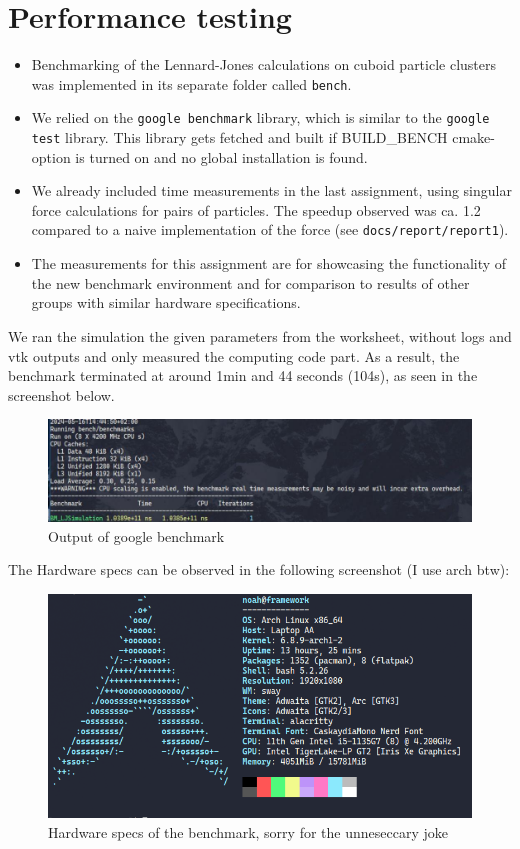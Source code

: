 \documentclass{article}
\begin{document}
\section{Performance testing}
\label{sec:perf}
\begin{itemize}
    \item Benchmarking of the Lennard-Jones calculations on cuboid particle clusters was implemented in its separate folder called \texttt{bench}.
    \item We relied on the \verb|google benchmark| library, which is similar to the \verb|google test| library. This library gets fetched and built if BUILD\_BENCH cmake-option is turned on and no global installation is found.
    \item We already included time measurements in the last assignment, using singular force calculations for pairs of particles. The speedup observed was ca. 1.2 compared to a naive implementation of the force (see \texttt{docs/report/report1}).
    \item The measurements for this assignment are for showcasing the functionality of the new benchmark environment and for comparison to results of other groups with similar hardware specifications.
\end{itemize}
    We ran the simulation the given parameters from the worksheet, without logs and vtk outputs and only measured the computing code part. As a result, the benchmark terminated at around 1min and 44 seconds (104s), as seen in the screenshot below. 

    \begin{figure}[H]
        \includegraphics[width=\textwidth]{res/bench.jpeg}
        \caption{Output of google benchmark}
    \end{figure}

    The Hardware specs can be observed in the following screenshot (I use arch btw):
    \begin{figure}[H]
        \includegraphics[width=\textwidth]{res/neofetch.png}
        \caption{Hardware specs of the benchmark, sorry for the unneseccary joke}
    \end{figure}
   
\end{document}
